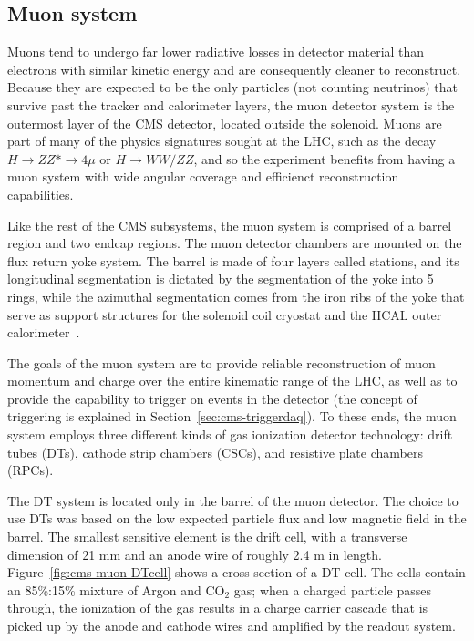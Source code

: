 \subsection{Muon system\label{sec:cms-muon}}
  
Muons tend to undergo far lower radiative losses in detector material than electrons with similar kinetic energy and are consequently cleaner to reconstruct. Because they are expected to be the only particles (not counting neutrinos) that survive past the tracker and calorimeter layers, the muon detector system is the outermost layer of the CMS detector, located outside the solenoid. Muons are part of many of the physics signatures sought at the LHC, such as the decay $H\rightarrow$$ZZ*\rightarrow$$4\mu$ or $H\rightarrow WW/ZZ$, and so the experiment benefits from having a muon system with wide angular coverage and efficienct reconstruction capabilities.

Like the rest of the CMS subsystems, the muon system is comprised of a barrel region and two endcap regions. The muon detector chambers are mounted on the flux return yoke system. The barrel is made of four layers called stations, and its longitudinal segmentation is dictated by the segmentation of the yoke into 5 rings, while the azimuthal segmentation comes from the iron ribs of the yoke that serve as support structures for the solenoid coil cryostat and the HCAL outer calorimeter~\cite{MuonTDR}.

The goals of the muon system are to provide reliable reconstruction of muon momentum and charge over the entire kinematic range of the LHC, as well as to provide the capability to trigger on events in the detector (the concept of triggering is explained in Section~\ref{sec:cms-triggerdaq}). To these ends, the muon system employs three different kinds of gas ionization detector technology: drift tubes (DTs), cathode strip chambers (CSCs), and resistive plate chambers (RPCs).

The DT system is located only in the barrel of the muon detector. The choice to use DTs was based on the low expected particle flux and low magnetic field in the barrel. The smallest sensitive element is the drift cell, with a transverse dimension of 21 mm and an anode wire of roughly 2.4 m in length. Figure~\ref{fig:cms-muon-DTcell} shows a cross-section of a DT cell. The cells contain an 85\%:15\% mixture of Argon and CO$_2$ gas; when a charged particle passes through, the ionization of the gas results in a charge carrier cascade that is picked up by the anode and cathode wires and amplified by the readout system.

